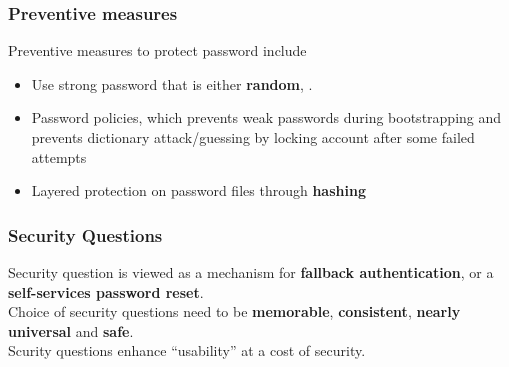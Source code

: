 \documentclass[12pt]{article}
\theoremstyle{definition}
\begin{document}
\subsubsection{Preventive measures}
Preventive measures to protect password include
\begin{itemize}
  \item Use strong password that is either \textbf{random}, .
  \item Password policies, which prevents weak passwords during bootstrapping and prevents dictionary attack/guessing by locking account after some failed attempts
  \item Layered protection on password files through \textbf{hashing}
\end{itemize}
\subsubsection{Security Questions}
Security question is viewed as a mechanism for \textbf{fallback authentication}, or a \textbf{self-services password reset}.\\
Choice of security questions need to be \textbf{memorable}, \textbf{consistent}, \textbf{nearly universal} and \textbf{safe}.\\
Scurity questions enhance ``usability'' at a cost of security.
\end{document}

